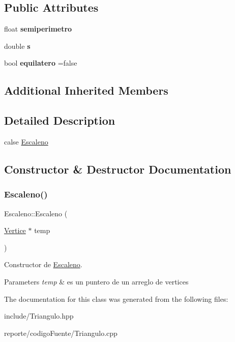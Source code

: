 \subsection*{Public Attributes}
\begin{DoxyCompactItemize}
\item 
\mbox{\label{class_escaleno_aa7147d8466b9cd87a787a898fed69eec}} 
float {\bfseries semiperimetro}
\item 
\mbox{\label{class_escaleno_a27961baaa7d8644ca529f200ba968eaa}} 
double {\bfseries s}
\item 
\mbox{\label{class_escaleno_a7f99f69fedcbe964007f90d831e172bf}} 
bool {\bfseries equilatero} =false
\end{DoxyCompactItemize}
\subsection*{Additional Inherited Members}


\subsection{Detailed Description}
calse \hyperlink{class_escaleno}{Escaleno} 

\subsection{Constructor \& Destructor Documentation}
\mbox{\label{class_escaleno_a2670875a1c4940661ea68fb97a8e2da1}} 
\subsubsection{\texorpdfstring{Escaleno()}{Escaleno()}}
{\footnotesize\ttfamily Escaleno\+::\+Escaleno (\begin{DoxyParamCaption}\item[{\hyperlink{class_vertice}{Vertice} $\ast$}]{temp }\end{DoxyParamCaption})}



Constructor de \hyperlink{class_escaleno}{Escaleno}. 


\begin{DoxyParams}{Parameters}
{\em temp} & es un puntero de un arreglo de vertices \\
\hline
\end{DoxyParams}


The documentation for this class was generated from the following files\+:\begin{DoxyCompactItemize}
\item 
include/Triangulo.\+hpp\item 
reporte/codigo\+Fuente/Triangulo.\+cpp\end{DoxyCompactItemize}
